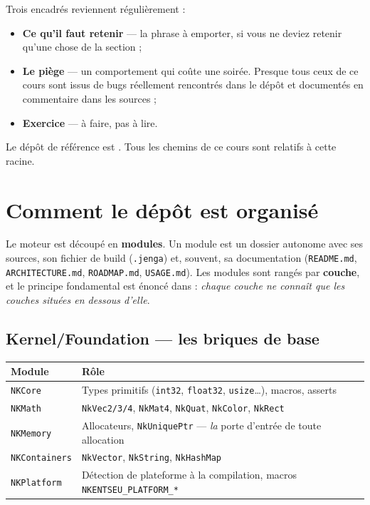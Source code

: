 Trois encadrés reviennent régulièrement :

\begin{itemize}
  \item \textbf{Ce qu'il faut retenir} — la phrase à emporter, si vous ne
        deviez retenir qu'une chose de la section ;
  \item \textbf{Le piège} — un comportement qui coûte une soirée. Presque tous
        ceux de ce cours sont issus de bugs réellement rencontrés dans le dépôt
        et documentés en commentaire dans les sources ;
  \item \textbf{Exercice} — à faire, pas à lire.
\end{itemize}

Le dépôt de référence est . Tous les
chemins de ce cours sont relatifs à cette racine.

\section{Comment le dépôt est organisé}

Le moteur est découpé en \textbf{modules}. Un module est un dossier autonome
avec ses sources, son fichier de build (\texttt{.jenga}) et, souvent, sa
documentation (\texttt{README.md}, \texttt{ARCHITECTURE.md},
\texttt{ROADMAP.md}, \texttt{USAGE.md}). Les modules sont rangés par
\textbf{couche}, et le principe fondamental est énoncé dans
 : \emph{chaque couche ne connaît que les couches situées
en dessous d'elle}.

\subsection{Kernel/Foundation — les briques de base}

\begin{center}
\begin{tabular}{@{}ll@{}}
\toprule
\textbf{Module} & \textbf{Rôle} \\
\midrule
\texttt{NKCore}       & Types primitifs (\texttt{int32}, \texttt{float32}, \texttt{usize}\dots), macros, asserts \\
\texttt{NKMath}       & \texttt{NkVec2/3/4}, \texttt{NkMat4}, \texttt{NkQuat}, \texttt{NkColor}, \texttt{NkRect} \\
\texttt{NKMemory}     & Allocateurs, \texttt{NkUniquePtr} — \emph{la} porte d'entrée de toute allocation \\
\texttt{NKContainers} & \texttt{NkVector}, \texttt{NkString}, \texttt{NkHashMap} \\
\texttt{NKPlatform}   & Détection de plateforme à la compilation, macros \texttt{NKENTSEU\_PLATFORM\_*} \\
\bottomrule
\end{tabular}
\end{center}

